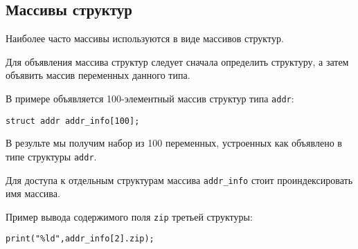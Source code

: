 \subsection{Массивы структур}

Наиболее часто массивы используются в виде массивов структур. 

Для объявления массива структур следует сначала определить структуру, а затем объявить массив переменных данного типа. 

В примере объявляется 100-элементный массив структур типа \texttt{addr}:

\begin{verbatim}
struct addr addr_info[100]; 
\end{verbatim}

В результе мы получим набор из 100 переменных, устроенных как объявлено в типе структуры \texttt{addr}.

Для доступа к отдельным структурам массива \texttt{addr\_info} стоит проиндексировать имя массива.

Пример вывода содержимого поля \texttt{zip} третьей структуры:

\begin{verbatim}
print("%ld",addr_info[2].zip);
\end{verbatim}
